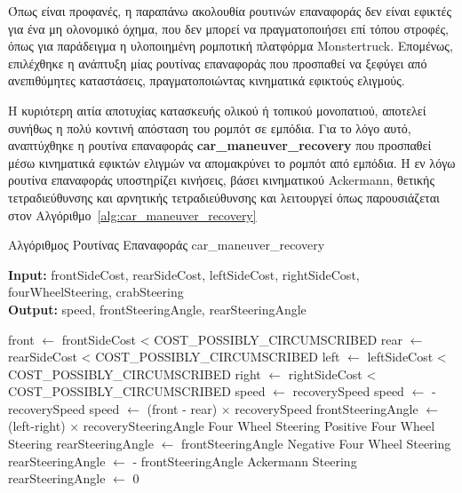 \bigskip
Όπως είναι προφανές, η παραπάνω ακολουθία ρουτινών επαναφοράς δεν είναι εφικτές για ένα μη ολονομικό όχημα, που δεν μπορεί να πραγματοποιήσει επί τόπου στροφές, όπως για παράδειγμα η υλοποιημένη ρομποτική πλατφόρμα Monstertruck. Επομένως, επιλέχθηκε η ανάπτυξη μίας ρουτίνας επαναφοράς που προσπαθεί να ξεφύγει από ανεπιθύμητες καταστάσεις, πραγματοποιώντας κινηματικά εφικτούς ελιγμούς.

\bigskip
Η κυριότερη αιτία αποτυχίας κατασκευής ολικού ή τοπικού μονοπατιού, αποτελεί συνήθως η πολύ κοντινή απόσταση του ρομπότ σε εμπόδια. Για το λόγο αυτό, αναπτύχθηκε η ρουτίνα επαναφοράς \textbf{car{\_}maneuver{\_}recovery} που προσπαθεί μέσω κινηματικά εφικτών ελιγμών να απομακρύνει το ρομπότ από εμπόδια. Η εν λόγω ρουτίνα επαναφοράς υποστηρίζει κινήσεις, βάσει κινηματικού Ackermann, θετικής τετραδιεύθυνσης και αρνητικής τετραδιεύθυνσης και λειτουργεί όπως παρουσιάζεται στον Αλγόριθμο~\ref{alg:car_maneuver_recovery}

\newpage
\begin{algorithm}[!ht]
	\caption{Αλγόριθμος Ρουτίνας Επαναφοράς car{\_}maneuver{\_}recovery}
	\label{alg:car_maneuver_recovery}
	\textbf{Input:} frontSideCost, rearSideCost, leftSideCost, rightSideCost, fourWheelSteering, crabSteering\\
	\textbf{Output:} speed, frontSteeringAngle, rearSteeringAngle
	\begin{algorithmic}[1]
		\State front $\leftarrow$ frontSideCost < COST{\_}POSSIBLY{\_}CIRCUMSCRIBED
		\State rear  $\leftarrow$ rearSideCost < COST{\_}POSSIBLY{\_}CIRCUMSCRIBED
		\State left  $\leftarrow$ leftSideCost < COST{\_}POSSIBLY{\_}CIRCUMSCRIBED
		\State right $\leftarrow$ rightSideCost < COST{\_}POSSIBLY{\_}CIRCUMSCRIBED
				\State speed $\leftarrow$ recoverySpeed
			\Else
				\State speed $\leftarrow$ -recoverySpeed
			\EndIf
		\Else
			\State speed $\leftarrow$ (front - rear) $\times$ recoverySpeed
		\EndIf
		\State frontSteeringAngle $\leftarrow$ (left-right) $\times$ recoverySteeringAngle
			\Comment Four Wheel Steering
			 \Comment Positive Four Wheel Steering
				\State rearSteeringAngle $\leftarrow$ frontSteeringAngle
			\Else \Comment Negative Four Wheel Steering
				\State rearSteeringAngle $\leftarrow$ - frontSteeringAngle
			\EndIf
		\Else \Comment Ackermann Steering
			\State rearSteeringAngle $\leftarrow$ 0
		\EndIf
	\end{algorithmic}
\end{algorithm}


